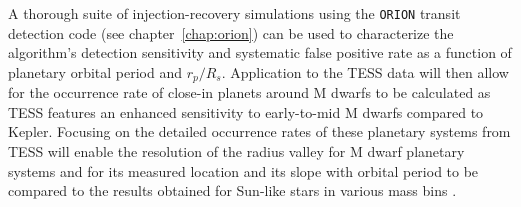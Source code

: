 A thorough suite of injection-recovery simulations using the \texttt{ORION}
transit detection code (see chapter~\ref{chap:orion}) can be used to
characterize the algorithm's detection sensitivity and systematic false positive
rate as a function of planetary orbital period and $r_p/R_s$. Application to the
TESS data will then allow for the occurrence rate of close-in planets around M
dwarfs to be calculated as TESS features an enhanced sensitivity to early-to-mid
M dwarfs compared to Kepler. Focusing on the detailed occurrence rates of these
planetary systems from TESS will enable the resolution of the radius valley for
M dwarf planetary systems and for its measured location and its slope with
orbital period to be compared to the results obtained for Sun-like stars in
various mass bins \citep{fulton18}.
